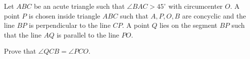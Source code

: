 Let $ABC$ be an acute triangle such that $\angle BAC > 45^{\circ}$ with circumcenter $O$. A point $P$ is chosen inside triangle $ABC$ such that $A, P, O, B$ are concyclic and the line $BP$ is perpendicular to the line $CP$. A point $Q$ lies on the segment $BP$ such that the line $AQ$ is parallel to the line $PO$.

Prove that $\angle QCB = \angle PCO$.